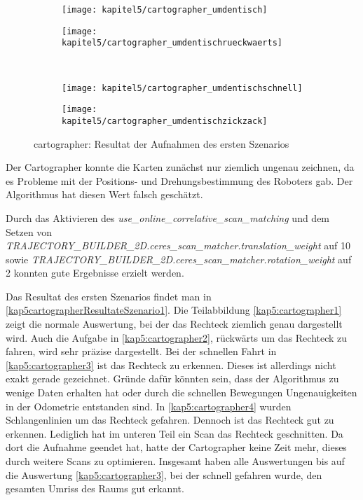 \begin{figure}[b]
  \centering
  \begin{subfigure}[b]{0.4\linewidth}
    \centering
    \texttt{[image: kapitel5/cartographer\_umdentisch]}
    \label{kap5:cartographer1}
  \end{subfigure}%
  \qquad
  \begin{subfigure}[b]{.4\linewidth}
    \centering
    \texttt{[image: kapitel5/cartographer\_umdentischrueckwaerts]}
    \label{kap5:cartographer2}
  \end{subfigure}\\
  \vspace{2\floatsep}
  \begin{subfigure}[b]{.4\linewidth}
    \centering
    \texttt{[image: kapitel5/cartographer\_umdentischschnell]}
    \label{kap5:cartographer3}
  \end{subfigure}%
    \qquad
  \begin{subfigure}[b]{.4\linewidth}
    \centering
    \texttt{[image: kapitel5/cartographer\_umdentischzickzack]}
    \label{kap5:cartographer4}
  \end{subfigure}%
  \qquad
  \caption{cartographer: Resultat der Aufnahmen des ersten Szenarios}
  \label{kap5cartographerResultateSzenario1}
\end{figure}

Der Cartographer konnte die Karten zunächst nur ziemlich ungenau zeichnen, da es Probleme mit der Positions- und Drehungsbestimmung des Roboters gab. Der Algorithmus hat diesen Wert falsch geschätzt.

Durch das Aktivieren des \textit{use\_online\_correlative\_scan\_matching} und dem Setzen von \textit{TRAJECTORY\_BUILDER\_2D.ceres\_scan\_matcher.translation\_weight} auf 10
 sowie \textit{TRAJECTORY\_BUILDER\_2D.ceres\_scan\_matcher.rotation\_weight} auf 2 konnten gute Ergebnisse erzielt werden.
 
Das Resultat des ersten Szenarios findet man in \autoref{kap5cartographerResultateSzenario1}. Die Teilabbildung \autoref{kap5:cartographer1} zeigt die normale Auswertung, bei der das Rechteck ziemlich genau dargestellt wird. Auch die Aufgabe in \autoref{kap5:cartographer2}, rückwärts um das Rechteck zu fahren, wird sehr präzise dargestellt. Bei der schnellen Fahrt in \autoref{kap5:cartographer3} ist das Rechteck zu erkennen. Dieses ist allerdings nicht exakt gerade gezeichnet. Gründe dafür könnten sein, dass der Algorithmus zu wenige Daten erhalten hat oder durch die schnellen Bewegungen Ungenauigkeiten in der Odometrie entstanden sind. In \autoref{kap5:cartographer4} wurden Schlangenlinien um das Rechteck gefahren. Dennoch ist das Rechteck gut zu erkennen. Lediglich hat im unteren Teil ein Scan das Rechteck geschnitten. Da dort die Aufnahme geendet hat, hatte der Cartographer keine Zeit mehr, dieses durch weitere Scans zu optimieren. Insgesamt haben alle Auswertungen bis auf die Auswertung \autoref{kap5:cartographer3}, bei der schnell gefahren wurde, den gesamten Umriss des Raums gut erkannt.

